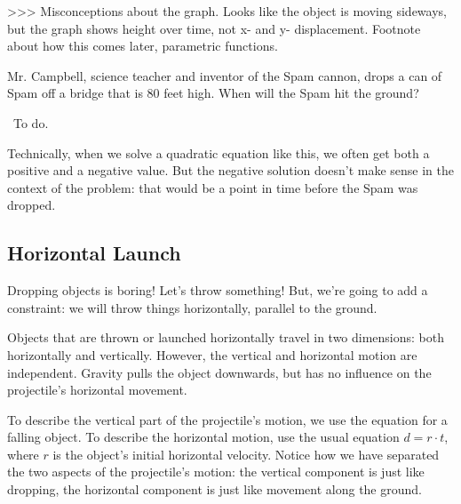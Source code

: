 >>> Misconceptions about the graph. Looks like the object is moving sideways, but the graph shows height over time, not x- and y- displacement. Footnote about how this comes later, parametric functions.

%
%
%
%
%
\begin{boxedex}
Mr. Campbell, science teacher and inventor of the Spam cannon, drops a can of Spam off a bridge that is 80 feet high. When will the Spam hit the ground?

\exsoln\ To do.
%
\end{boxedex}

Technically, when we solve a quadratic equation like this, we often get both a positive and a negative value. But the negative solution doesn't make sense in the context of the problem: that would be a point in time before the Spam was dropped.

\subsection{Horizontal Launch}

Dropping objects is boring! Let's throw something! But, we're going to add a constraint: we will throw things horizontally, parallel to the ground.

Objects that are thrown or launched horizontally travel in two dimensions: both horizontally and vertically. However, the vertical and horizontal motion are independent. Gravity pulls the object downwards, but has no influence on the projectile's horizontal movement.

To describe the vertical part of the projectile's motion, we use the equation for a falling object. To describe the horizontal motion, use the usual equation $d = r\cdot t$, where $r$ is the object's initial horizontal velocity. Notice how we have separated the two aspects of the projectile's motion: the vertical component is just like dropping, the horizontal component is just like movement along the ground.


%
%
%

